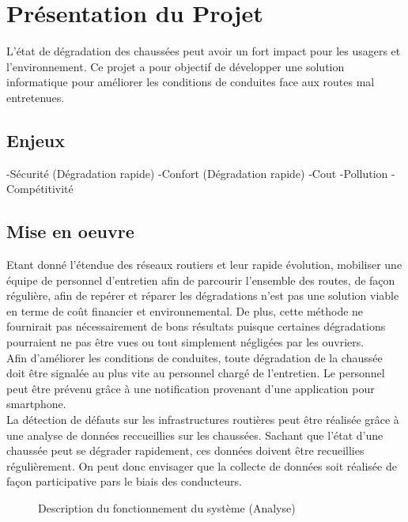\section{Présentation du Projet}
L'état de dégradation des chaussées peut avoir un fort impact pour les usagers et l'environnement. Ce projet a pour objectif de développer une solution informatique pour améliorer les conditions de conduites face aux routes mal entretenues.

\subsection{Enjeux}

-Sécurité (Dégradation rapide)
-Confort (Dégradation rapide)
-Cout
-Pollution
-Compétitivité


\subsection{Mise en oeuvre}
Etant donné l'étendue des réseaux routiers et leur rapide évolution, mobiliser une équipe de personnel d'entretien afin de parcourir l'ensemble des routes, de façon régulière, afin de repérer et réparer les dégradations n'est pas une solution viable en terme de coût financier et environnemental. De plus, cette méthode ne fournirait pas nécessairement de bons résultats puisque certaines dégradations pourraient ne pas être vues ou tout simplement négligées par les ouvriers.\\

Afin d'améliorer les conditions de conduites, toute dégradation de la chaussée doit être signalée au plus vite au personnel chargé de l'entretien. Le personnel peut être prévenu grâce à une notification provenant d'une application pour smartphone.\\

La détection de défauts sur les infrastructures routières peut être réalisée grâce à une analyse de données reccueillies sur les chaussées. Sachant que l'état d'une chaussée peut se dégrader rapidement, ces données doivent être recueillies régulièrement. On peut donc envisager que la collecte de données soit réalisée de façon participative pars le biais des conducteurs.\cite{test}\\


\begin{figure}[H]
    \centering
    \caption{Description du fonctionnement du système (Analyse)}
    \label{analyse}
\end{figure}


